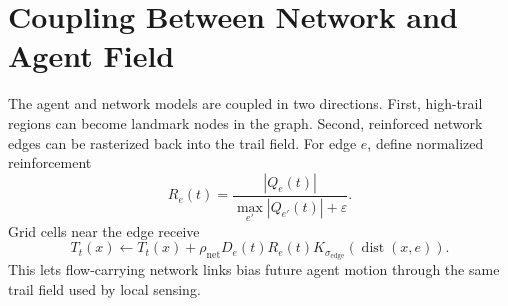 \documentclass[11pt]{article}
\begin{document}
\section{Coupling Between Network and Agent Field}
The agent and network models are coupled in two directions. First, high-trail
regions can become landmark nodes in the graph. Second, reinforced network edges
can be rasterized back into the trail field. For edge $e$, define normalized
reinforcement
\begin{equation}
  R_e(t)=\frac{|Q_e(t)|}{\max_{e'}|Q_{e'}(t)|+\varepsilon}.
\end{equation}
Grid cells near the edge receive
\begin{equation}
  T_t(x)\leftarrow T_t(x)+
  \rho_{\mathrm{net}}D_e(t)R_e(t)
  K_{\sigma_{\mathrm{edge}}}(\operatorname{dist}(x,e)).
\end{equation}
This lets flow-carrying network links bias future agent motion through the same
trail field used by local sensing.
\end{document}
